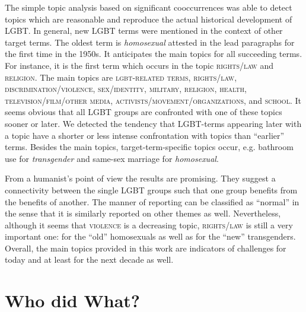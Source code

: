 \documentclass[10pt,a4paper,twocolumn]{scrartcl}
\begin{document}
The simple topic analysis based on significant cooccurrences was able to detect topics which are reasonable and reproduce the actual historical development of LGBT. In general, new LGBT terms were mentioned in the context of other target terms. The oldest term is \textit{homosexual} attested in the lead paragraphs for the first time in the 1950s. It anticipates the main topics for all succeeding terms. For instance, it is the first term which occurs in the topic \textsc{rights/law} and \textsc{religion}. The main topics are  \textsc{lgbt-related terms}, \textsc{rights/law}, \textsc{discrimination/violence}, \textsc{sex/identity}, \textsc{military}, \textsc{religion}, \textsc{health}, \textsc{television/film/other media}, \textsc{activists/movement/organizations}, and \textsc{school}. It seems obvious that all LGBT groups are confronted with one of these topics sooner or later. We detected the tendency that LGBT-terms appearing later with a topic have a shorter or less intense confrontation with topics than ``earlier'' terms. Besides the main topics, target-term-specific topics occur, e.g. bathroom use for \textit{transgender} and same-sex marriage for \textit{homosexual}. 

From a humanist's point of view the results are promising. They suggest a connectivity between the single LGBT groups such that one group benefits from the benefits of another. The manner of reporting can be classified as ``normal'' in the sense that it is similarly reported on other themes as well. Nevertheless, although it seems that \textsc{violence} is a decreasing topic, \textsc{rights/law} is still a very important one: for the ``old'' homosexuals as well as for the ``new'' transgenders. Overall, the main topics provided in this work are indicators of challenges for today and at least for the next decade as well.


{\footnotesize }

\onecolumn

\newpage

\section*{Who did What?}
\end{document}
